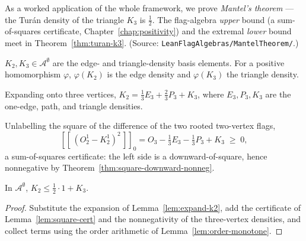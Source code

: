 As a worked application of the whole framework, we prove \emph{Mantel's theorem}
--- the Tur\'an density of the triangle $K_3$ is $\tfrac12$. The flag-algebra
\emph{upper} bound (a sum-of-squares certificate, Chapter~\ref{chap:positivity})
and the extremal \emph{lower} bound meet in Theorem~\ref{thm:turan-k3}. (Source:
\texttt{LeanFlagAlgebras/MantelTheorem/}.)

\begin{definition}
  \label{def:densities}
  \leanok
  $K_2, K_3 \in \mathcal{A}^\emptyset$ are the edge- and triangle-density basis
  elements. For a positive homomorphism $\varphi$, $\varphi(K_2)$ is the edge
  density and $\varphi(K_3)$ the triangle density.
\end{definition}

\begin{lemma}
  \label{lem:expand-k2}
  \leanok
  Expanding onto three vertices,
  $K_2 = \tfrac13 E_3 + \tfrac23 P_3 + K_3$, where $E_3, P_3, K_3$ are the
  one-edge, path, and triangle densities.
\end{lemma}

\begin{lemma}
  \label{lem:square-cert}
  \leanok
  Unlabelling the square of the difference of the two rooted two-vertex flags,
  \[ [\![\,(O_2^{1} - K_2^{1})^2\,]\!]_0
      = O_3 - \tfrac13 E_3 - \tfrac13 P_3 + K_3 \;\ge\; 0, \]
  a sum-of-squares certificate: the left side is a downward-of-square, hence
  nonnegative by Theorem~\ref{thm:square-downward-nonneg}.
\end{lemma}

\begin{theorem}
  \label{thm:mantel-flag}
  \leanok
  In $\mathcal{A}^\emptyset$, $K_2 \le \tfrac12\cdot 1 + K_3$.
\end{theorem}
\begin{proof}
  \leanok
  Substitute the expansion of Lemma~\ref{lem:expand-k2}, add the certificate of
  Lemma~\ref{lem:square-cert} and the nonnegativity of the three-vertex
  densities, and collect terms using the order arithmetic of
  Lemma~\ref{lem:order-monotone}.
\end{proof}

